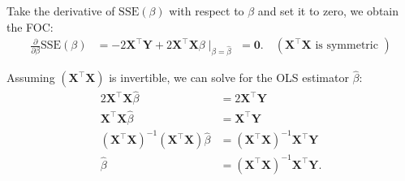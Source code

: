 \documentclass[12pt]{article}
\begin{document}
Take the derivative of $\mathrm{SSE}(\beta)$ with respect to $\beta$ and set it to zero, we obtain the FOC:
\begin{align*}
    \frac{\partial}{\partial \beta}\mathrm{SSE}(\beta) &= -2\mathbf{X}^\top \mathbf{Y} + 2\mathbf{X}^\top \mathbf{X}\beta\mid_{\beta=\hat\beta} \, \,= \mathbf{0}. \quad{ (\mathbf{X}^\top \mathbf{X}\text{ is symmetric })}
\end{align*}

Assuming $(\mathbf{X}^\top \mathbf{X})$ is invertible, we can solve for the OLS estimator $\hat{\beta}$:
\begin{align*}
    2\mathbf{X}^\top \mathbf{X}\hat{\beta} &= 2\mathbf{X}^\top \mathbf{Y} \\
    \mathbf{X}^\top \mathbf{X}\hat{\beta} &= \mathbf{X}^\top \mathbf{Y} \\
    (\mathbf{X}^\top \mathbf{X})^{-1}(\mathbf{X}^\top \mathbf{X})\hat{\beta} &= (\mathbf{X}^\top \mathbf{X})^{-1}\mathbf{X}^\top \mathbf{Y} \\
    \hat{\beta} &= (\mathbf{X}^\top \mathbf{X})^{-1}\mathbf{X}^\top \mathbf{Y}.
\end{align*}
\end{document}
